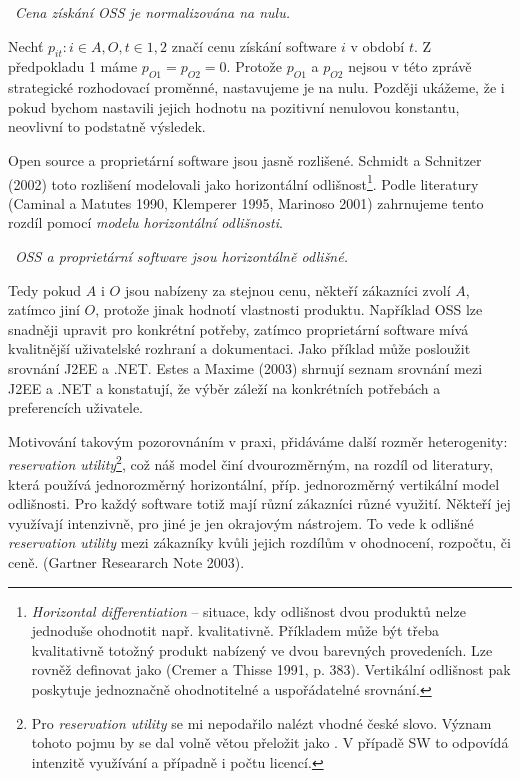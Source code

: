 \begin{multicols}{2}
	\vspace{10pt}
	~{\em Cena získání OSS je normalizována na nulu.}
	\vspace{10pt}

	Nechť $p_{it}: i \in {A,O}, t \in {1,2}$ značí cenu získání software $i$ v období $t$. Z předpokladu 1 máme $p_{O1} = p_{O2} = 0$. Protože $p_{O1}$ a $p_{O2}$ nejsou v této zprávě strategické rozhodovací proměnné, nastavujeme je na nulu. Později ukážeme, že i pokud bychom nastavili jejich hodnotu na pozitivní nenulovou konstantu, neovlivní to podstatně výsledek.

	Open source a proprietární software jsou jasně rozlišené. Schmidt a Schnitzer (2002) toto rozlišení modelovali jako horizontální odlišnost\footnote{{\em Horizontal differentiation} -- situace, kdy odlišnost dvou produktů nelze jednoduše ohodnotit např. kvalitativně. Příkladem může být třeba kvalitativně totožný produkt nabízený ve dvou barevných provedeních. Lze rovněž definovat jako {\em{}} (Cremer a Thisse 1991, p. 383). Vertikální odlišnost pak poskytuje jednoznačně ohodnotitelné a uspořádatelné srovnání.}. Podle literatury (Caminal a Matutes 1990, Klemperer 1995, Marinoso 2001) zahrnujeme tento rozdíl pomocí {\em modelu horizontální odlišnosti}.

	\vspace{10pt}
	~{\em OSS a proprietární software jsou horizontálně odlišné.}
	\vspace{10pt}

	Tedy pokud $A$ i $O$ jsou nabízeny za stejnou cenu, někteří zákazníci zvolí $A$, zatímco jiní $O$, protože jinak hodnotí vlastnosti produktu. Například OSS lze snadněji upravit pro konkrétní potřeby, zatímco proprietární software mívá kvalitnější uživatelské rozhraní a dokumentaci. Jako příklad může posloužit srovnání J2EE a .NET. Estes a Maxime (2003) shrnují seznam srovnání mezi J2EE a .NET a konstatují, že výběr záleží na konkrétních potřebách a preferencích  uživatele.

	Motivování takovým pozorovnáním v praxi, přidáváme další rozměr heterogenity: {\em reservation utility}\footnote{Pro {\em reservation utility} se mi nepodařilo nalézt vhodné české slovo. Význam tohoto pojmu by se dal volně větou přeložit jako . V případě SW to odpovídá intenzitě využívání a případně i počtu licencí.}, což náš model činí dvourozměrným, na rozdíl od literatury, která používá jednorozměrný horizontální, příp. jednorozměrný vertikální model odlišnosti. Pro každý software totiž mají různí zákazníci různé využití. Někteří jej využívají intenzivně, pro jiné je jen okrajovým nástrojem. To vede k odlišné {\em reservation utility} mezi zákazníky kvůli jejich rozdílům v ohodnocení, rozpočtu, či ceně. (Gartner Researarch Note 2003).


\end{multicols}
